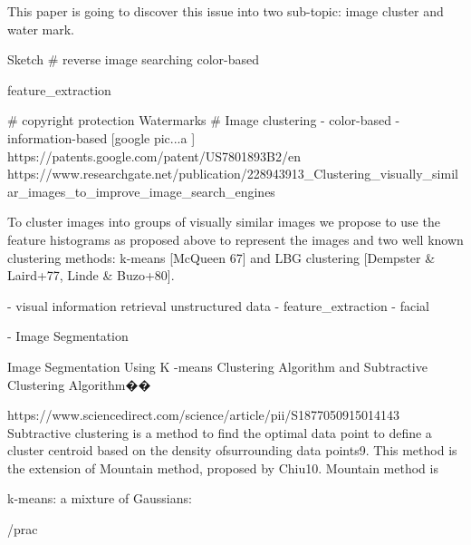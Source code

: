 This paper is going to discover this issue into two sub-topic: image cluster and water mark.

Sketch
# reverse image searching
    color-based

    feature_extraction   

# copyright protection
    Watermarks  
# Image clustering
    - color-based
    - information-based [google pic...a ]
    https://patents.google.com/patent/US7801893B2/en  
    https://www.researchgate.net/publication/228943913_Clustering_visually_similar_images_to_improve_image_search_engines  {

To cluster images into groups of visually similar images we propose to use the feature histograms as proposed above to represent the images and two well known clustering methods: k-means [McQueen 67] and LBG clustering [Dempster & Laird+77, Linde & Buzo+80]. 
    }
        - visual information retrieval
         unstructured data
        - feature_extraction   
        - facial 

        - Image Segmentation  

Image Segmentation Using K -means Clustering Algorithm and Subtractive Clustering Algorithm��{
https://www.sciencedirect.com/science/article/pii/S1877050915014143
Subtractive clustering is a method to find the optimal data point to define a cluster centroid based on the density ofsurrounding data points9. This method is the extension of Mountain method, proposed by Chiu10. Mountain method is

}

k-means: 
a mixture of Gaussians: 


/prac

